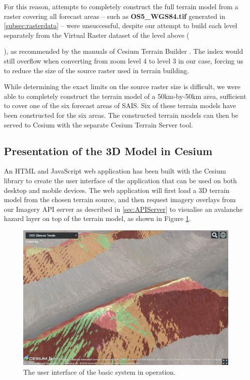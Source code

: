 \documentclass[11pt, oneside]{article}
\begin{document}
		For this reason, attempts to completely construct the full terrain model from a raster covering all forecast areas -- such as \textbf{OS5\_WGS84.tif} generated in \ref{subsec:rasterdata} -- were unsuccessful, despite our attempt to build each level separately from the Virtual Raster dataset of the level above ({), as recommended by the manuals of Cesium Terrain Builder \cite{cesium-terrain-builder}. The index would still overflow when converting from zoom level 4 to level 3 in our case, forcing us to reduce the size of the source raster used in terrain building.
		
		While determining the exact limits on the source raster size is difficult, we were able to completely construct the terrain model of a 50km-by-50km area, sufficient to cover one of the six forecast areas of SAIS. Six of these terrain models have been constructed for the six areas. The constructed terrain models can then be served to Cesium with the separate Cesium Terrain Server \cite{cesium-terrain-server} tool.
		
	\subsection{Presentation of the 3D Model in Cesium}
		
		An HTML and JavaScript web application has been built with the Cesium library to create the user interface of the application that can be used on both desktop and mobile devices. The web application will first load a 3D terrain model from the chosen terrain source, and then request imagery overlays from our Imagery API server as described in \ref{sec:APIServer} to visualise an avalanche hazard layer on top of the terrain model, as shown in Figure \ref{fig:UI}.
		\begin{figure}[h]
		\centering
		\includegraphics[scale=0.5]{UI.png}
		\caption{\label{fig:UI}The user interface of the basic system in operation.}
		\end{figure}
		
}
\end{document}
